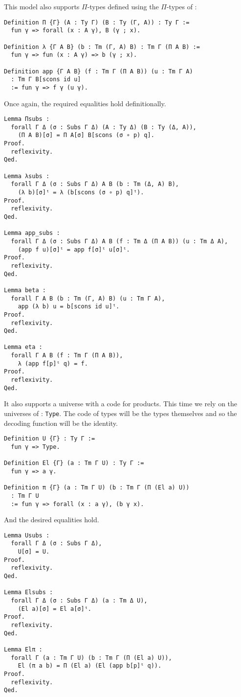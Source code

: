 This model also supports \(\Pi\)-types defined using the \(\Pi\)-types of
\Coq:
\begin{verbatim}
Definition Π {Γ} (A : Ty Γ) (B : Ty (Γ, A)) : Ty Γ :=
  fun γ => forall (x : A γ), B (γ ; x).

Definition λ {Γ A B} (b : Tm (Γ, A) B) : Tm Γ (Π A B) :=
  fun γ => fun (x : A γ) => b (γ ; x).

Definition app {Γ A B} (f : Tm Γ (Π A B)) (u : Tm Γ A)
  : Tm Γ B[scons id u]
  := fun γ => f γ (u γ).
\end{verbatim}

Once again, the required equalities hold definitionally.
\begin{verbatim}
Lemma Πsubs :
  forall Γ Δ (σ : Subs Γ Δ) (A : Ty Δ) (B : Ty (Δ, A)),
    (Π A B)[σ] = Π A[σ] B[scons (σ ∘ p) q].
Proof.
  reflexivity.
Qed.

Lemma λsubs :
  forall Γ Δ (σ : Subs Γ Δ) A B (b : Tm (Δ, A) B),
    (λ b)[σ]ᵗ = λ (b[scons (σ ∘ p) q]ᵗ).
Proof.
  reflexivity.
Qed.

Lemma app_subs :
  forall Γ Δ (σ : Subs Γ Δ) A B (f : Tm Δ (Π A B)) (u : Tm Δ A),
    (app f u)[σ]ᵗ = app f[σ]ᵗ u[σ]ᵗ.
Proof.
  reflexivity.
Qed.

Lemma beta :
  forall Γ A B (b : Tm (Γ, A) B) (u : Tm Γ A),
    app (λ b) u = b[scons id u]ᵗ.
Proof.
  reflexivity.
Qed.

Lemma eta :
  forall Γ A B (f : Tm Γ (Π A B)),
    λ (app f[p]ᵗ q) = f.
Proof.
  reflexivity.
Qed.
\end{verbatim}

It also supports a universe with a code for products. This time we rely on
the universes of \Coq: \texttt{Type}.
The code of types will be the types themselves and so the decoding function
will be the identity.
\begin{verbatim}
Definition U {Γ} : Ty Γ :=
  fun γ => Type.

Definition El {Γ} (a : Tm Γ U) : Ty Γ :=
  fun γ => a γ.

Definition π {Γ} (a : Tm Γ U) (b : Tm Γ (Π (El a) U))
  : Tm Γ U
  := fun γ => forall (x : a γ), (b γ x).
\end{verbatim}

And the desired equalities hold.
\begin{verbatim}
Lemma Usubs :
  forall Γ Δ (σ : Subs Γ Δ),
    U[σ] = U.
Proof.
  reflexivity.
Qed.

Lemma Elsubs :
  forall Γ Δ (σ : Subs Γ Δ) (a : Tm Δ U),
    (El a)[σ] = El a[σ]ᵗ.
Proof.
  reflexivity.
Qed.

Lemma Elπ :
  forall Γ (a : Tm Γ U) (b : Tm Γ (Π (El a) U)),
    El (π a b) = Π (El a) (El (app b[p]ᵗ q)).
Proof.
  reflexivity.
Qed.
\end{verbatim}

